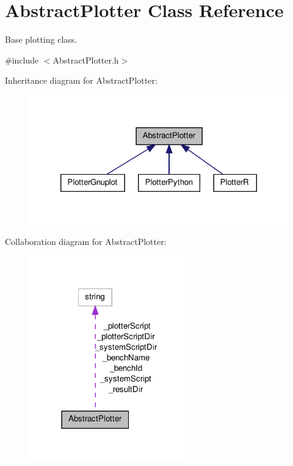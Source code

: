 \hypertarget{classAbstractPlotter}{\section{Abstract\-Plotter Class Reference}
\label{classAbstractPlotter}
}


Base plotting class.  




{\ttfamily \#include $<$Abstract\-Plotter.\-h$>$}



Inheritance diagram for Abstract\-Plotter\-:\nopagebreak
\begin{figure}[H]
\begin{center}
\leavevmode
\includegraphics[width=322pt]{classAbstractPlotter__inherit__graph}
\end{center}
\end{figure}


Collaboration diagram for Abstract\-Plotter\-:\nopagebreak
\begin{figure}[H]
\begin{center}
\leavevmode
\includegraphics[width=197pt]{classAbstractPlotter__coll__graph}
\end{center}
\end{figure}
